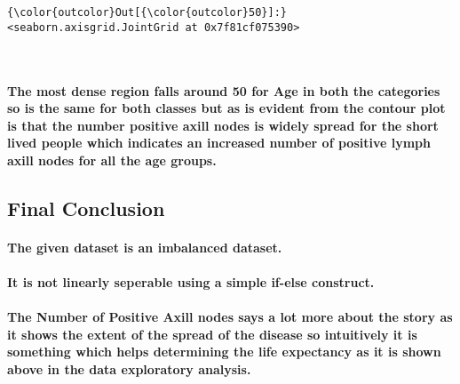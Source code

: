\documentclass[11pt]{article}
\begin{document}
\begin{Verbatim}[commandchars=\\\{\}]
{\color{outcolor}Out[{\color{outcolor}50}]:} <seaborn.axisgrid.JointGrid at 0x7f81cf075390>
\end{Verbatim}
            
    \begin{center}
    \end{center}
    { \hspace*{\fill} \\}
    
    \paragraph{The most dense region falls around 50 for Age in both the
categories so is the same for both classes but as is evident from the
contour plot is that the number positive axill nodes is widely spread
for the short lived people which indicates an increased number of
positive lymph axill nodes for all the age
groups.}\label{the-most-dense-region-falls-around-50-for-age-in-both-the-categories-so-is-the-same-for-both-classes-but-as-is-evident-from-the-contour-plot-is-that-the-number-positive-axill-nodes-is-widely-spread-for-the-short-lived-people-which-indicates-an-increased-number-of-positive-lymph-axill-nodes-for-all-the-age-groups.}

    \subsection{Final Conclusion}\label{final-conclusion}

\paragraph{The given dataset is an imbalanced
dataset.}\label{the-given-dataset-is-an-imbalanced-dataset.}

\paragraph{It is not linearly seperable using a simple if-else
construct.}\label{it-is-not-linearly-seperable-using-a-simple-if-else-construct.}

\paragraph{The Number of Positive Axill nodes says a lot more about the
story as it shows the extent of the spread of the disease so intuitively
it is something which helps determining the life expectancy as it is
shown above in the data exploratory
analysis.}\label{the-number-of-positive-axill-nodes-says-a-lot-more-about-the-story-as-it-shows-the-extent-of-the-spread-of-the-disease-so-intuitively-it-is-something-which-helps-determining-the-life-expectancy-as-it-is-shown-above-in-the-data-exploratory-analysis.}


    
    
    
    
\end{document}
